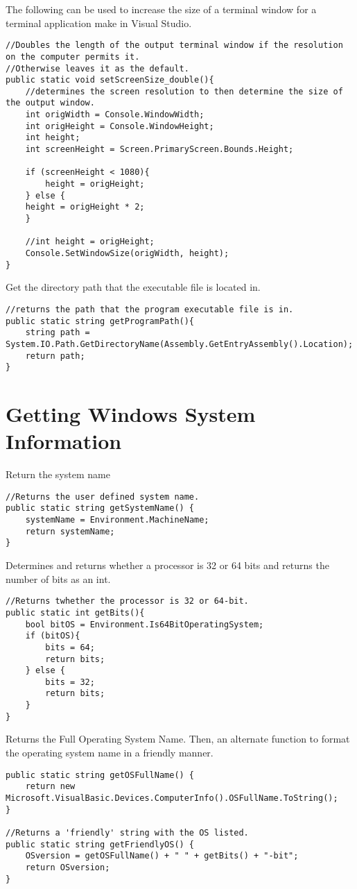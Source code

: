 The following can be used to increase the size of a terminal window for a terminal application make in Visual Studio.
\begin{lstlisting}
//Doubles the length of the output terminal window if the resolution on the computer permits it.
//Otherwise leaves it as the default.
public static void setScreenSize_double(){
	//determines the screen resolution to then determine the size of the output window.
	int origWidth = Console.WindowWidth;
	int origHeight = Console.WindowHeight;
	int height;
	int screenHeight = Screen.PrimaryScreen.Bounds.Height;
	
	if (screenHeight < 1080){
		height = origHeight;
	} else {
	height = origHeight * 2;
	}
	
	//int height = origHeight;
	Console.SetWindowSize(origWidth, height);       
}
\end{lstlisting}

Get the directory path that the executable file is located in.
\begin{lstlisting}
//returns the path that the program executable file is in.
public static string getProgramPath(){
	string path = System.IO.Path.GetDirectoryName(Assembly.GetEntryAssembly().Location);
	return path;
}
\end{lstlisting}










\section{Getting Windows System Information}

Return the system name
\begin{lstlisting}
//Returns the user defined system name.
public static string getSystemName() {
	systemName = Environment.MachineName;
	return systemName;
}
\end{lstlisting}

Determines and returns whether a processor is 32 or 64 bits and returns the number of bits as an int.
\begin{lstlisting}
//Returns twhether the processor is 32 or 64-bit.
public static int getBits(){
	bool bitOS = Environment.Is64BitOperatingSystem;
	if (bitOS){
		bits = 64;
		return bits;
	} else {
		bits = 32;
		return bits;
	}
}
\end{lstlisting}

Returns the Full Operating System Name. Then, an alternate function to format the operating system name in a friendly manner.
\begin{lstlisting}
public static string getOSFullName() {
	return new Microsoft.VisualBasic.Devices.ComputerInfo().OSFullName.ToString();
}

//Returns a 'friendly' string with the OS listed.
public static string getFriendlyOS() {
	OSversion = getOSFullName() + " " + getBits() + "-bit";
	return OSversion;
}
\end{lstlisting}

